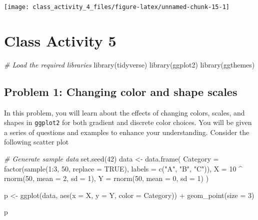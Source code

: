 \documentclass[
]{book}
\newenvironment{Shaded}{\begin{snugshade}}{\end{snugshade}}
\newcommand{\AttributeTok}[1]{\textcolor[rgb]{0.77,0.63,0.00}{#1}}
\newcommand{\CommentTok}[1]{\textcolor[rgb]{0.56,0.35,0.01}{\textit{#1}}}
\newcommand{\ConstantTok}[1]{\textcolor[rgb]{0.00,0.00,0.00}{#1}}
\newcommand{\DecValTok}[1]{\textcolor[rgb]{0.00,0.00,0.81}{#1}}
\newcommand{\FunctionTok}[1]{\textcolor[rgb]{0.00,0.00,0.00}{#1}}
\newcommand{\NormalTok}[1]{#1}
\newcommand{\OtherTok}[1]{\textcolor[rgb]{0.56,0.35,0.01}{#1}}
\newcommand{\SpecialCharTok}[1]{\textcolor[rgb]{0.00,0.00,0.00}{#1}}
\newcommand{\StringTok}[1]{\textcolor[rgb]{0.31,0.60,0.02}{#1}}
\begin{document}
\texttt{[image: class\_activity\_4\_files/figure-latex/unnamed-chunk-15-1]}

\hypertarget{class-activity-5}{%
\chapter{Class Activity 5}\label{class-activity-5}}

\begin{Shaded}
\begin{Highlighting}[]
\CommentTok{\# Load the required libraries}
\FunctionTok{library}\NormalTok{(tidyverse)}
\FunctionTok{library}\NormalTok{(ggplot2)}
\FunctionTok{library}\NormalTok{(ggthemes)}
\end{Highlighting}
\end{Shaded}

\hypertarget{problem-1-changing-color-and-shape-scales}{%
\section{Problem 1: Changing color and shape scales}\label{problem-1-changing-color-and-shape-scales}}

In this problem, you will learn about the effects of changing colors, scales, and shapes in \texttt{ggplot2} for both gradient and discrete color choices. You will be given a series of questions and examples to enhance your understanding. Consider the following scatter plot

\begin{Shaded}
\begin{Highlighting}[]
\CommentTok{\# Generate sample data}
\FunctionTok{set.seed}\NormalTok{(}\DecValTok{42}\NormalTok{)}
\NormalTok{data }\OtherTok{\textless{}{-}} \FunctionTok{data.frame}\NormalTok{(}
  \AttributeTok{Category =} \FunctionTok{factor}\NormalTok{(}\FunctionTok{sample}\NormalTok{(}\DecValTok{1}\SpecialCharTok{:}\DecValTok{3}\NormalTok{, }\DecValTok{50}\NormalTok{, }\AttributeTok{replace =} \ConstantTok{TRUE}\NormalTok{), }\AttributeTok{labels =} \FunctionTok{c}\NormalTok{(}\StringTok{"A"}\NormalTok{, }\StringTok{"B"}\NormalTok{, }\StringTok{"C"}\NormalTok{)),}
  \AttributeTok{X =} \DecValTok{10} \SpecialCharTok{\^{}} \FunctionTok{rnorm}\NormalTok{(}\DecValTok{50}\NormalTok{, }\AttributeTok{mean =} \DecValTok{2}\NormalTok{, }\AttributeTok{sd =} \DecValTok{1}\NormalTok{),}
  \AttributeTok{Y =} \FunctionTok{rnorm}\NormalTok{(}\DecValTok{50}\NormalTok{, }\AttributeTok{mean =} \DecValTok{0}\NormalTok{, }\AttributeTok{sd =} \DecValTok{1}\NormalTok{)}
\NormalTok{)}

\NormalTok{p }\OtherTok{\textless{}{-}} \FunctionTok{ggplot}\NormalTok{(data, }\FunctionTok{aes}\NormalTok{(}\AttributeTok{x =}\NormalTok{ X, }\AttributeTok{y =}\NormalTok{ Y, }\AttributeTok{color =}\NormalTok{ Category)) }\SpecialCharTok{+}
  \FunctionTok{geom\_point}\NormalTok{(}\AttributeTok{size =} \DecValTok{3}\NormalTok{)}

\NormalTok{p}
\end{Highlighting}
\end{Shaded}
\end{document}
